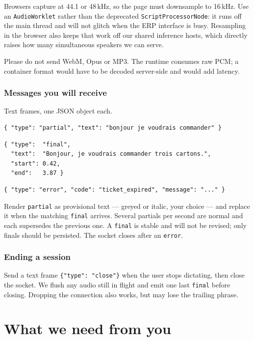 \documentclass[11pt,a4paper]{article}
\begin{document}
Browsers capture at 44.1 or 48\,kHz, so the page must downsample to 16\,kHz. Use an
\texttt{AudioWorklet} rather than the deprecated \texttt{ScriptProcessorNode}: it runs off
the main thread and will not glitch when the ERP interface is busy. Resampling in the
browser also keeps that work off our shared inference hosts, which directly raises how
many simultaneous speakers we can serve.

Please do not send WebM, Opus or MP3. The runtime consumes raw PCM; a container format
would have to be decoded server-side and would add latency.

\subsubsection*{Messages you will receive}

Text frames, one JSON object each.

\begin{lstlisting}
{ "type": "partial", "text": "bonjour je voudrais commander" }
\end{lstlisting}

\begin{lstlisting}
{ "type":  "final",
  "text":  "Bonjour, je voudrais commander trois cartons.",
  "start": 0.42,
  "end":   3.87 }
\end{lstlisting}

\begin{lstlisting}
{ "type": "error", "code": "ticket_expired", "message": "..." }
\end{lstlisting}

Render \texttt{partial} as provisional text --- greyed or italic, your choice --- and
replace it when the matching \texttt{final} arrives. Several partials per second are
normal and each supersedes the previous one. A \texttt{final} is stable and will not be
revised; only finals should be persisted. The socket closes after an \texttt{error}.

\subsubsection*{Ending a session}

Send a text frame \texttt{\{"type": "close"\}} when the user stops dictating, then close
the socket. We flush any audio still in flight and emit one last \texttt{final} before
closing. Dropping the connection also works, but may lose the trailing phrase.

\section{What we need from you}
\end{document}
